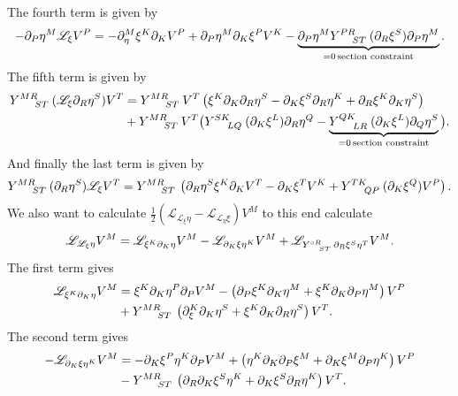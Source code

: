The fourth term is given by 
\begin{equation}
    -\pd_P\eta^M\mathscr{L}_\xi V^P = -\pd_\eta^M\xi^K\pd_KV^P+\pd_P\eta^M\pd_K\xi^PV^K-\underbrace{\pd_P\eta^M\tensor{Y}{^{PR}_{ST}}(\pd_R\xi^S)\pd_P\eta^M}_{=0\, \text{section constraint}}.
\end{equation}
The fifth term is given by 
\begin{equation}
    \begin{aligned}
        \tensor{Y}{^{MR}_{ST}}(\mathscr{L}_\xi \pd_R\eta^S)V^T &= \tensor{Y}{^{MR}_{ST}}V^T\left(\xi^K\pd_K\pd_R\eta^S-\pd_K\xi^S\pd_R\eta^K+\pd_R\xi^K\pd_K\eta^S\right)\\
        &+\tensor{Y}{^{MR}_{ST}}V^T\big(\tensor{Y}{^{SK}_{LQ}}(\pd_K\xi^L)\pd_R\eta^Q-\underbrace{\tensor{Y}{^{QK}_{LR}}(\pd_K\xi^L)\pd_Q\eta^S}_{=0\, \text{section constraint}}\big).
    \end{aligned}
\end{equation}
And finally the last term is given by 
\begin{equation}
    \begin{aligned}
        \tensor{Y}{^{MR}_{ST}}(\pd_R\eta^S)\mathscr{L}_\xi V^T = \tensor{Y}{^{MR}_{ST}}\left(\pd_R\eta^S\xi^K\pd_KV^T-\pd_K\xi^TV^K+\tensor{Y}{^{TK}_{QP}}(\pd_K\xi^Q)V^P\right).
    \end{aligned}
\end{equation}
We also want to calculate $\frac{1}{2}(\mathscr{L}_{\mathscr{L}_\xi\eta}-\mathscr{L}_{\mathscr{L}_\eta\xi})V^M$ to this end calculate
\begin{equation}
    \mathscr{L}_{\mathscr{L}_\xi \eta}V^M = \mathscr{L}_{\xi^K\pd_K\eta}V^M-\mathscr{L}_{\pd_K\xi\eta^K}V^M+\mathscr{L}_{\tensor{Y}{^{\circ R}_{ST}}\pd_R\xi^S\eta^T}V^M.
\end{equation}
The first term gives 
\begin{equation}
    \begin{aligned}
        \mathscr{L}_{\xi^K\pd_K\eta}V^M &= \xi^K\pd_K\eta^P\pd_PV^M-\left(\pd_P\xi^K\pd_K\eta^M+\xi^K\pd_K\pd_P\eta^M\right)V^P\\
        &+\tensor{Y}{^{MR}_{ST}}\left(\pd_\xi^K\pd_K\eta^S+\xi^K\pd_K\pd_R\eta^S\right)V^T.
    \end{aligned}
\end{equation}
The second term gives 
\begin{equation}
    \begin{aligned}
        -\mathscr{L}_{\pd_K\xi\eta^K}V^M &= -\pd_K\xi^P\eta^K\pd_PV^M+\left(\eta^K\pd_K\pd_P\xi^M+\pd_K\xi^M\pd_P\eta^K\right)V^P\\
        &-\tensor{Y}{^{MR}_{ST}}\left(\pd_R\pd_K\xi^S\eta^K+\pd_K\xi^S\pd_R\eta^K\right)V^T.
    \end{aligned}
\end{equation}

